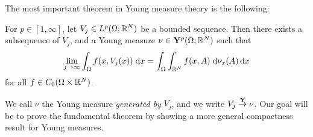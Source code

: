 The most important theorem in Young measure theory is the following:
\begin{theorem} \label{thm:fundamentalTheoremOfYoungMeasures}
    For $p \in [1,\infty]$, let $V_j \in L^p(\Omega;\mathbb{R}^N)$ be a bounded sequence. Then there exists a subsequence of $V_j$, and a Young measure $\nu \in \mathbf{Y}^p(\Omega;\mathbb{R}^N)$ such that
    \begin{equation} \label{eq:youngLimitForContinuousFunctions}
        \lim_{j \to \infty} \int_\Omega f(x,V_j(x)) \; \mathrm{d} x = \int_\Omega \int_{\mathbb{R}^N} f(x,A) \; \mathrm{d}\nu_x(A) \, \mathrm{d} x
    \end{equation}
    for all $f \in C_0(\Omega \times \mathbb{R}^N)$.
\end{theorem}
We call $\nu$ the Young measure \textit{generated by} $V_j$, and we write $V_j \overset{\mathbf{Y}}{\rightarrow} \nu$. Our goal will be to prove the fundamental theorem by showing a more general compactness result for Young measures.

